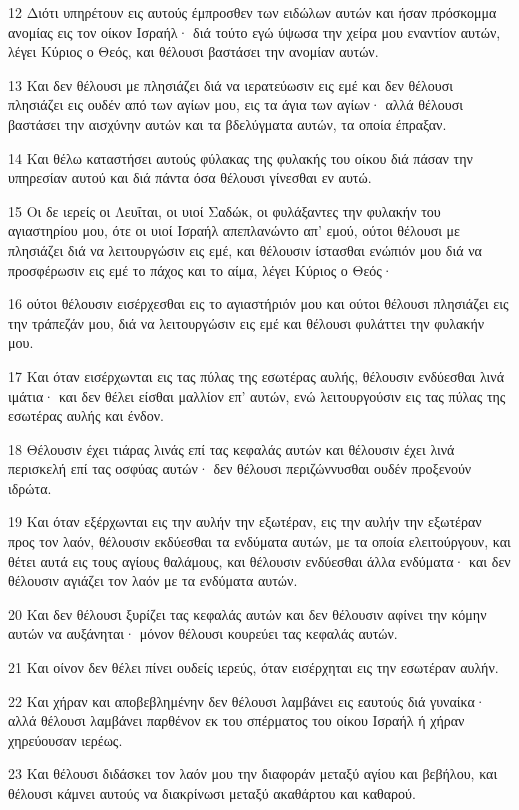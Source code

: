 \par 12 Διότι υπηρέτουν εις αυτούς έμπροσθεν των ειδώλων αυτών και ήσαν πρόσκομμα ανομίας εις τον οίκον Ισραήλ· διά τούτο εγώ ύψωσα την χείρα μου εναντίον αυτών, λέγει Κύριος ο Θεός, και θέλουσι βαστάσει την ανομίαν αυτών.
\par 13 Και δεν θέλουσι με πλησιάζει διά να ιερατεύωσιν εις εμέ και δεν θέλουσι πλησιάζει εις ουδέν από των αγίων μου, εις τα άγια των αγίων· αλλά θέλουσι βαστάσει την αισχύνην αυτών και τα βδελύγματα αυτών, τα οποία έπραξαν.
\par 14 Και θέλω καταστήσει αυτούς φύλακας της φυλακής του οίκου διά πάσαν την υπηρεσίαν αυτού και διά πάντα όσα θέλουσι γίνεσθαι εν αυτώ.
\par 15 Οι δε ιερείς οι Λευΐται, οι υιοί Σαδώκ, οι φυλάξαντες την φυλακήν του αγιαστηρίου μου, ότε οι υιοί Ισραήλ απεπλανώντο απ' εμού, ούτοι θέλουσι με πλησιάζει διά να λειτουργώσιν εις εμέ, και θέλουσιν ίστασθαι ενώπιόν μου διά να προσφέρωσιν εις εμέ το πάχος και το αίμα, λέγει Κύριος ο Θεός·
\par 16 ούτοι θέλουσιν εισέρχεσθαι εις το αγιαστήριόν μου και ούτοι θέλουσι πλησιάζει εις την τράπεζάν μου, διά να λειτουργώσιν εις εμέ και θέλουσι φυλάττει την φυλακήν μου.
\par 17 Και όταν εισέρχωνται εις τας πύλας της εσωτέρας αυλής, θέλουσιν ενδύεσθαι λινά ιμάτια· και δεν θέλει είσθαι μαλλίον επ' αυτών, ενώ λειτουργούσιν εις τας πύλας της εσωτέρας αυλής και ένδον.
\par 18 Θέλουσιν έχει τιάρας λινάς επί τας κεφαλάς αυτών και θέλουσιν έχει λινά περισκελή επί τας οσφύας αυτών· δεν θέλουσι περιζώννυσθαι ουδέν προξενούν ιδρώτα.
\par 19 Και όταν εξέρχωνται εις την αυλήν την εξωτέραν, εις την αυλήν την εξωτέραν προς τον λαόν, θέλουσιν εκδύεσθαι τα ενδύματα αυτών, με τα οποία ελειτούργουν, και θέτει αυτά εις τους αγίους θαλάμους, και θέλουσιν ενδύεσθαι άλλα ενδύματα· και δεν θέλουσιν αγιάζει τον λαόν με τα ενδύματα αυτών.
\par 20 Και δεν θέλουσι ξυρίζει τας κεφαλάς αυτών και δεν θέλουσιν αφίνει την κόμην αυτών να αυξάνηται· μόνον θέλουσι κουρεύει τας κεφαλάς αυτών.
\par 21 Και οίνον δεν θέλει πίνει ουδείς ιερεύς, όταν εισέρχηται εις την εσωτέραν αυλήν.
\par 22 Και χήραν και αποβεβλημένην δεν θέλουσι λαμβάνει εις εαυτούς διά γυναίκα· αλλά θέλουσι λαμβάνει παρθένον εκ του σπέρματος του οίκου Ισραήλ ή χήραν χηρεύουσαν ιερέως.
\par 23 Και θέλουσι διδάσκει τον λαόν μου την διαφοράν μεταξύ αγίου και βεβήλου, και θέλουσι κάμνει αυτούς να διακρίνωσι μεταξύ ακαθάρτου και καθαρού.
